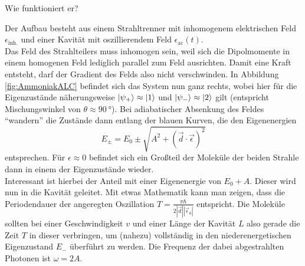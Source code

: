 \begin{fquestion}{Wie funktioniert er?}
    
    Der Aufbau besteht aus einem Strahltrenner mit inhomogenem elektrischen Feld $\epsilon_\text{inh.}$ und einer Kavität mit oszillierendem Feld $\epsilon_\text{ac}(t)$.
    \\
    Das Feld des Strahlteilers muss inhomogen sein, weil sich die Dipolmomente in einem homogenen Feld lediglich parallel zum Feld ausrichten.
    Damit eine Kraft entsteht, darf der Gradient des Felds also nicht verschwinden.
    In Abbildung \ref{fig:AmmoniakALC} befindet sich das System nun ganz rechts, wobei hier für die Eigenzustände näherungsweise $\ket{\psi_+}\approx \ket{1}$ und $\ket{\psi_-}\approx \ket{2}$ gilt (entspricht Mischungswinkel von $\theta\approx \SI{90}{\degree}$).
    Bei adiabatischer Absenkung des Feldes ``wandern'' die Zustände dann entlang der blauen Kurven, die den Eigenenergien 
    $$E_\pm = E_0 \pm \sqrt{A^2 + (\Vec{d}\cdot\Vec{\epsilon})^2}$$
    entsprechen.
    Für $\epsilon\approx 0$ befindet sich ein Großteil der Moleküle der beiden Strahle dann in einem der Eigenzustände wieder.
    \\
    Interessant ist hierbei der Anteil mit einer Eigenenergie von $E_0 + A$.
    Dieser wird nun in die Kavität geleitet.
    Mit etwas Mathematik kann man zeigen, dass die Periodendauer der angeregten Oszillation $T=\frac{\pi\hbar}{2|\Vec{d}||\Vec{\epsilon}_0|}$ entspricht.
    Die Moleküle sollten bei einer Geschwindigkeit $v$ und einer Länge der Kavität $L$ also gerade die Zeit $T$ in dieser verbringen, um (nahezu) vollständig in den niederenergetischen Eigenzustand $E_-$ überführt zu werden.
    Die Frequenz der dabei abgestrahlten Photonen ist $\omega = 2 A$.
\end{fquestion}


